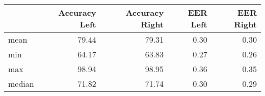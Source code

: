 \begin{tabular}{lrrrr}
\toprule
{} &  Accuracy Left &  Accuracy Right &  EER Left &  EER Right \\
\midrule
mean   &          79.44 &           79.31 &      0.30 &       0.30 \\
min    &          64.17 &           63.83 &      0.27 &       0.26 \\
max    &          98.94 &           98.95 &      0.36 &       0.35 \\
median &          71.82 &           71.74 &      0.30 &       0.29 \\
\bottomrule
\end{tabular}

